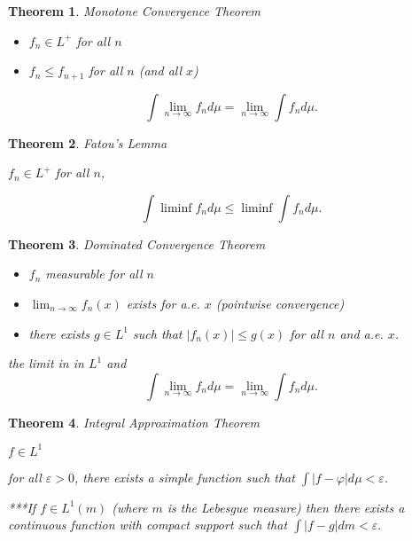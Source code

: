 \documentclass[12pt]{Qual}
\newtheorem{theorem}{Theorem}
\begin{document}
\begin{theorem}{\Large\textit{Monotone Convergence Theorem}}

\vspace{-0.25cm}
\begin{itemize}[leftmargin=2.5cm]
\setlength\itemsep{-0.1em}
\renewcommand\labelitemi{\faPuzzlePiece}
    \item $f_n\in L^+$ for all $n$
    \item $f_n\le f_{n+1}$ for all $n$ (and all $x$)
\end{itemize}

 $$\int\lim_{n\to\infty}f_nd\mu=\lim_{n\to\infty}\int f_nd\mu.$$

\end{theorem}
\vspace{0.5cm}
\begin{theorem}{\Large\textit{Fatou's Lemma}}

 $f_n\in L^+$ for all $n$,

 $$\int\liminf f_nd\mu\le\liminf\int f_nd\mu.$$

\end{theorem}
\vspace{0.5cm}
\begin{theorem}{\Large\textit{Dominated Convergence Theorem}}

\vspace{-0.25cm}
\begin{itemize}[leftmargin=2.5cm]
\setlength\itemsep{-0.1em}
\renewcommand\labelitemi{\faPuzzlePiece}
    \item $f_n$ measurable for all $n$
    \item $\displaystyle\lim_{n\to\infty}f_n(x)$ exists for a.e. $x$ (pointwise convergence)
    \item there exists $g\in L^1$ such that $|f_n(x)|\le g(x)$ for all $n$ and a.e. $x$.
\end{itemize}

 the limit in in $L^1$ and $$\int\lim_{n\to\infty}f_nd\mu=\lim_{n\to\infty}\int f_nd\mu.$$

\end{theorem}
\vspace{0.5cm}
\begin{theorem}{\Large\textit{Integral Approximation Theorem}}

 $f\in L^1$

 for all $\varepsilon>0$, there exists a simple function such that $\displaystyle\int|f-\varphi|d\mu<\varepsilon$.

\begin{mybox}
***If $f\in L^1(m)$ (where $m$ is the Lebesgue measure) then there exists a continuous function with compact support such that $\displaystyle\int|f-g|dm<\varepsilon.$
\end{mybox}

\end{theorem}
\end{document}
